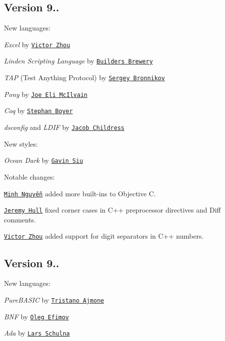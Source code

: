\subsection*{Version 9..}

New languages\+:


\begin{DoxyItemize}
\item {\itshape Excel} by \href{https://github.com/OiCMudkips}{\tt Victor Zhou}
\item {\itshape Linden Scripting Language} by \href{https://github.com/buildersbrewery}{\tt Builder\textquotesingle{}s Brewery}
\item {\itshape T\+AP} (Test Anything Protocol) by \href{https://github.com/ligurio}{\tt Sergey Bronnikov}
\item {\itshape Pony} by \href{https://github.com/jemc}{\tt Joe Eli Mc\+Ilvain}
\item {\itshape Coq} by \href{https://github.com/boyers}{\tt Stephan Boyer}
\item {\itshape dsconfig} and {\itshape L\+D\+IF} by \href{https://github.com/braveulysses}{\tt Jacob Childress}
\end{DoxyItemize}

New styles\+:


\begin{DoxyItemize}
\item {\itshape Ocean Dark} by \href{https://github.com/gavsiu}{\tt Gavin Siu}
\end{DoxyItemize}

Notable changes\+:


\begin{DoxyItemize}
\item \href{https://github.com/1ec5}{\tt Minh Nguyễn} added more built-\/ins to Objective C.
\item \href{https://github.com/sourrust}{\tt Jeremy Hull} fixed corner cases in C++ preprocessor directives and Diff comments.
\item \href{https://github.com/OiCMudkips}{\tt Victor Zhou} added support for digit separators in C++ numbers.
\end{DoxyItemize}

\subsection*{Version 9..}

New languages\+:


\begin{DoxyItemize}
\item {\itshape Pure\+B\+A\+S\+IC} by \href{https://github.com/tajmone}{\tt Tristano Ajmone}
\item {\itshape B\+NF} by \href{https://github.com/sannis}{\tt Oleg Efimov}
\item {\itshape Ada} by \href{https://github.com/captain-hanuta}{\tt Lars Schulna}
\end{DoxyItemize}

